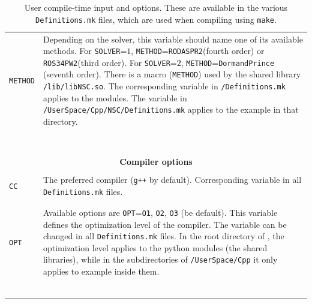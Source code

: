 \documentclass[11pt,a4paper]{article}
\begin{document}
\begin{table}[p]
\begin{tabular}{l l}
		{\tt METHOD}& \multirow{1}{12cm}{Depending on the solver, this variable should name one of its available methods. For {\tt SOLVER}=$1$, {\tt METHOD}={\tt RODASPR2}(fourth order) or {\tt ROS34PW2}(third order). For {\tt SOLVER}=$2$, {\tt METHOD}={\tt DormandPrince }(seventh order). There is a macro ({\tt METHOD}) used by the shared library {\tt \nsc/lib/libNSC.so}. The corresponding variable in {\tt \nsc/Definitions.mk} applies to the \PY modules. The variable in {\tt \nsc/UserSpace/Cpp/NSC/Definitions.mk} applies to the example in that directory.}\\\\\\\\\\\\\\\\
		 		
		\hline\\[-0.4cm]
		
		\multicolumn{2}{c}{\bf Compiler options}  \\
		\hline\\[-0.4cm]
		
		{\tt CC} &  \multirow{1}{12cm}{The preferred \CPP compiler ({\tt g++} by default). Corresponding variable in all {\tt Definitions.mk} files.} \\\\
		\hline\\[-0.4cm]
		
		{\tt OPT} &  \multirow{1}{12cm}{Available options are {\tt OPT}={\tt O1}, {\tt O2}, {\tt O3} (be default). This variable defines the optimization level of the compiler. The variable can be changed in all {\tt Definitions.mk} files. In the root directory of \nsc, the optimization level applies to the python modules (\ie the shared libraries), while in the subdirectories of {\tt \nsc/UserSpace/Cpp} it only applies to example inside them.}   \\\\\\\\\\\\
		\hline\\[-0.4cm]

	\end{tabular}
	\caption{User compile-time input and options. These are available in the various {\tt Definitions.mk} files, which are used when compiling using {\tt make}.}
	\label{tab:compile_time-options}
\end{table}



\pagebreak
{}
                        
\end{document}
